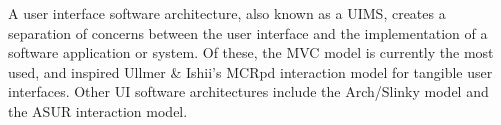 
A user interface software architecture, also known as a \ac{UIMS}, creates a separation of concerns between the user interface and the implementation of a software application or system. Of these, the \ac{MVC} model is currently the most used, and inspired Ullmer \& Ishii's \cite{Ullmer2000} \ac{MCRpd} interaction model for tangible user interfaces. Other UI software architectures include the Arch/Slinky model \cite{Bass1992} and the \ac{ASUR} interaction model.%

% 
% 
	
